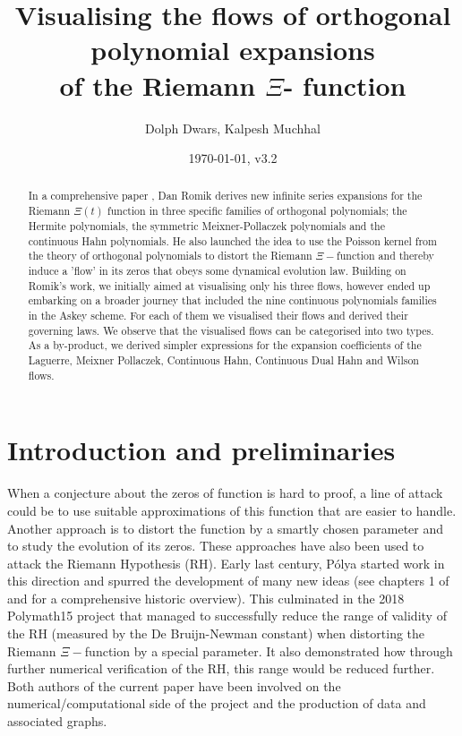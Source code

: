 \documentclass[a4paper,11pt,twoside]{amsart}
\title[Visualising the flows of orthogonal polynomial expansions of the Riemann $\Xi$-function]{Visualising the flows of orthogonal polynomial expansions \\ of the Riemann $\Xi$- function}
\author{Dolph Dwars, Kalpesh Muchhal}
\date{\today, v3.2}
\begin{document}
\begin{abstract}
In a comprehensive paper \cite{rom}, Dan Romik derives new infinite series expansions for the Riemann $\Xi(t)$ function in three specific families of orthogonal polynomials; the Hermite polynomials, the symmetric Meixner-Pollaczek polynomials and the continuous Hahn polynomials. He also launched the idea to use the Poisson kernel from the theory of orthogonal polynomials to distort the Riemann $\Xi-$function and thereby induce a 'flow' in its zeros that obeys some dynamical evolution law. Building on Romik's work, we initially aimed at visualising only his three flows, however ended up embarking on a broader journey that included the nine continuous polynomials families in the Askey scheme. For each of them we visualised their flows and derived their governing laws. We observe that the visualised flows can be categorised into two types. As a by-product, we derived simpler expressions for the expansion coefficients of the Laguerre, Meixner Pollaczek, Continuous Hahn, Continuous Dual Hahn and Wilson flows.  
\end{abstract}

\maketitle

\section{Introduction and preliminaries}

When a conjecture about the zeros of function is hard to proof, a line of attack could be to use suitable approximations of this function that are easier to handle. Another approach is to distort the function by a smartly chosen parameter and to study the evolution of its zeros. These approaches have also been used to attack the Riemann Hypothesis (RH). Early last century, Pólya started work in this direction and spurred the development of many new ideas (see chapters 1 of \cite{rom} and \cite{pol} for a comprehensive historic overview). This culminated in the 2018 Polymath15 project \cite{pol} that managed to successfully reduce the range of validity of the RH (measured by the De Bruijn-Newman constant) when distorting the Riemann $\Xi-$function by a special parameter. It also demonstrated how through further numerical verification of the RH, this range would be reduced further. Both authors of the current paper have been involved on the numerical/computational side of the project and the production of data and associated graphs. 
\end{document}
